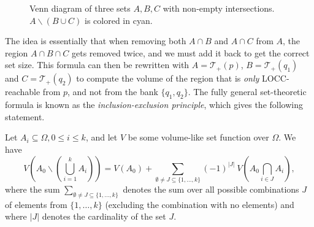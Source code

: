 \begin{figure}[h!] %
    \centering
    \caption{Venn diagram of three sets $A, B, C$ with non-empty intersections. $A \backslash (B \cup C)$ is colored in cyan.}
    \label{fig:venn_three}
\end{figure}

The idea is essentially that when removing both $A \cap B$ and $A \cap C$ from $A$, the region $A \cap B \cap C$ gets removed twice, and we must add it back to get the correct set size. This formula can then be rewritten with $A = \mathcal{T}_+(p)$, $B = \mathcal{T}_+(q_1)$ and $C = \mathcal{T}_+(q_2)$ to compute the volume of the region that is \textit{only} LOCC-reachable from $p$, and not from the bank $\{q_1, q_2\}$. The fully general set-theoretic formula is known as the \textit{inclusion-exclusion principle}, which gives the following statement.

\begin{theorem} \label{th:inclusion-exclusion}
    Let $A_i \subseteq \Omega, 0 \leq i \leq k$, and let $V$ be some volume-like set function over $\Omega$. We have
    \begin{equation}
        V\left(A_0 \backslash \left(\bigcup\limits_{i = 1}^k A_i\right)\right) = V(A_0) + \sum_{\emptyset \neq J \subseteq \{1, \dots, k\}} (-1)^{|J|} \: V\left(A_0 \bigcap\limits_{i \in J} A_i\right),
    \end{equation}
    where the sum $\sum_{\emptyset \neq J \subseteq \{1, \dots, k\}}$ denotes the sum over all possible combinations $J$ of elements from $\{1, \dots, k\}$ (excluding the combination with no elements) and where $|J|$ denotes the cardinality of the set $J$.
\end{theorem}

